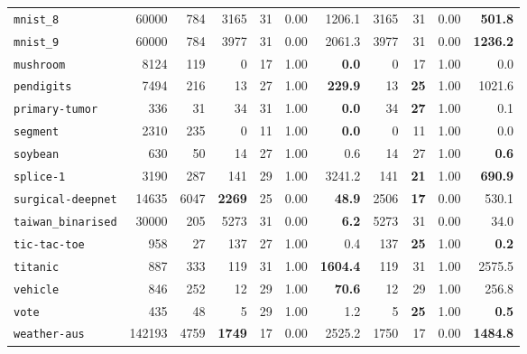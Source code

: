 \begin{tabular}{lccrrrrrrrr}
\texttt{mnist\_8} & \multicolumn{1}{r}{60000} & \multicolumn{1}{r}{784}  & 3165 & 31 & 0.00 & 1206.1 & 3165 & 31 & 0.00 & \textbf{501.8}\\
\texttt{mnist\_9} & \multicolumn{1}{r}{60000} & \multicolumn{1}{r}{784}  & 3977 & 31 & 0.00 & 2061.3 & 3977 & 31 & 0.00 & \textbf{1236.2}\\
\texttt{mushroom} & \multicolumn{1}{r}{8124} & \multicolumn{1}{r}{119}  & 0 & 17 & 1.00 & \textbf{0.0} & 0 & 17 & 1.00 & 0.0\\
\texttt{pendigits} & \multicolumn{1}{r}{7494} & \multicolumn{1}{r}{216}  & 13 & 27 & 1.00 & \textbf{229.9} & 13 & \textbf{25} & 1.00 & 1021.6\\
\texttt{primary-tumor} & \multicolumn{1}{r}{336} & \multicolumn{1}{r}{31}  & 34 & 31 & 1.00 & \textbf{0.0} & 34 & \textbf{27} & 1.00 & 0.1\\
\texttt{segment} & \multicolumn{1}{r}{2310} & \multicolumn{1}{r}{235}  & 0 & 11 & 1.00 & \textbf{0.0} & 0 & 11 & 1.00 & 0.0\\
\texttt{soybean} & \multicolumn{1}{r}{630} & \multicolumn{1}{r}{50}  & 14 & 27 & 1.00 & 0.6 & 14 & 27 & 1.00 & \textbf{0.6}\\
\texttt{splice-1} & \multicolumn{1}{r}{3190} & \multicolumn{1}{r}{287}  & 141 & 29 & 1.00 & 3241.2 & 141 & \textbf{21} & 1.00 & \textbf{690.9}\\
\texttt{surgical-deepnet} & \multicolumn{1}{r}{14635} & \multicolumn{1}{r}{6047}  & \textbf{2269} & 25 & 0.00 & \textbf{48.9} & 2506 & \textbf{17} & 0.00 & 530.1\\
\texttt{taiwan\_binarised} & \multicolumn{1}{r}{30000} & \multicolumn{1}{r}{205}  & 5273 & 31 & 0.00 & \textbf{6.2} & 5273 & 31 & 0.00 & 34.0\\
\texttt{tic-tac-toe} & \multicolumn{1}{r}{958} & \multicolumn{1}{r}{27}  & 137 & 27 & 1.00 & 0.4 & 137 & \textbf{25} & 1.00 & \textbf{0.2}\\
\texttt{titanic} & \multicolumn{1}{r}{887} & \multicolumn{1}{r}{333}  & 119 & 31 & 1.00 & \textbf{1604.4} & 119 & 31 & 1.00 & 2575.5\\
\texttt{vehicle} & \multicolumn{1}{r}{846} & \multicolumn{1}{r}{252}  & 12 & 29 & 1.00 & \textbf{70.6} & 12 & 29 & 1.00 & 256.8\\
\texttt{vote} & \multicolumn{1}{r}{435} & \multicolumn{1}{r}{48}  & 5 & 29 & 1.00 & 1.2 & 5 & \textbf{25} & 1.00 & \textbf{0.5}\\
\texttt{weather-aus} & \multicolumn{1}{r}{142193} & \multicolumn{1}{r}{4759}  & \textbf{1749} & 17 & 0.00 & 2525.2 & 1750 & 17 & 0.00 & \textbf{1484.8}\\

\end{tabular}
